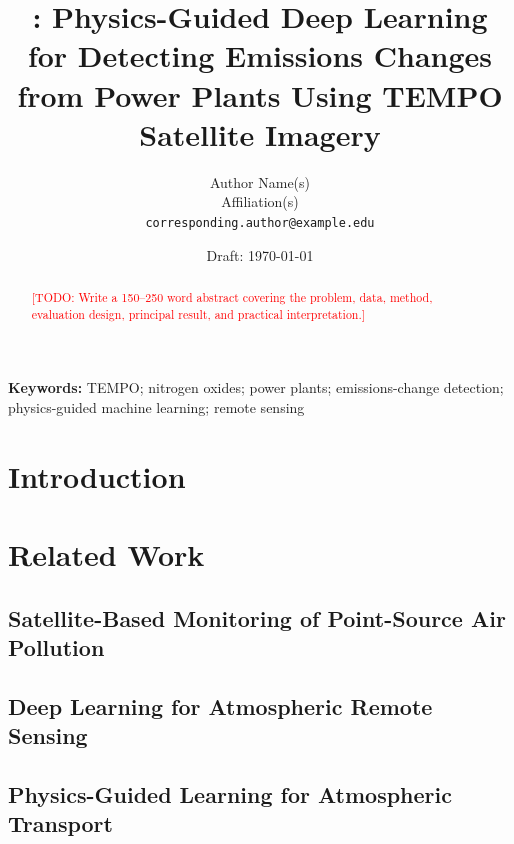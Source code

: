 \documentclass[11pt]{article}
\title{\modelname: Physics-Guided Deep Learning for Detecting
\texorpdfstring{\NOx}{NOx} Emissions Changes from Power Plants Using TEMPO
Satellite Imagery}
\author{%
  Author Name(s)\\
  Affiliation(s)\\
  \texttt{corresponding.author@example.edu}
}
\date{Draft: \today}
\newcommand{\todo}[1]{\textcolor{red}{[TODO: #1]}}
\begin{document}
\maketitle

\begin{abstract}
\todo{Write a 150--250 word abstract covering the problem, data, method,
evaluation design, principal result, and practical interpretation.}
\end{abstract}

\noindent\textbf{Keywords:}
TEMPO; nitrogen oxides; power plants; emissions-change detection;
physics-guided machine learning; remote sensing

\section{Introduction}
\label{sec:introduction}


\section{Related Work}
\label{sec:related-work}

\subsection{Satellite-Based Monitoring of Point-Source Air Pollution}

\subsection{Deep Learning for Atmospheric Remote Sensing}

\subsection{Physics-Guided Learning for Atmospheric Transport}
\end{document}
